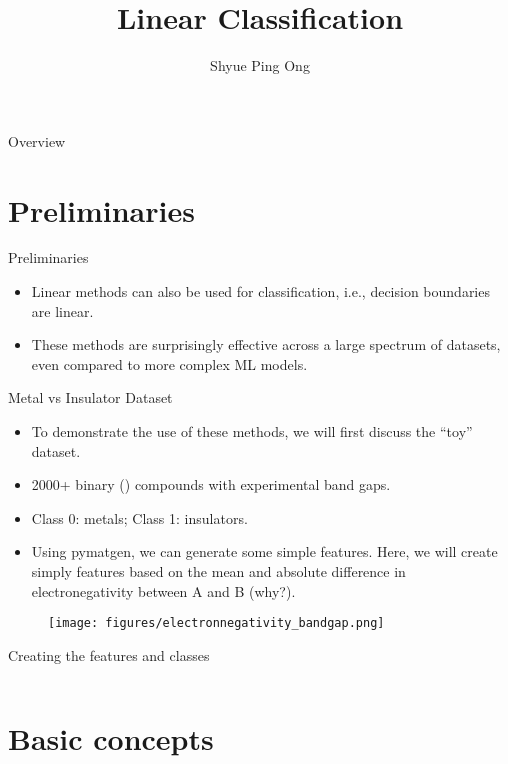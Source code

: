 \documentclass[aspectratio=169]{beamer}
\title[Linear Classification]{Linear Classification}
\author{Shyue Ping Ong}
\institute[UCSD]{University of California, San Diego\\
\medskip
}
\date{\classyear} %
\begin{document}
\begin{frame}
    \titlepage %
\end{frame}


\begin{frame}{Overview}
    \tableofcontents
\end{frame}


\section{Preliminaries}

\begin{frame}{Preliminaries}
    \begin{itemize}
        \item Linear methods can also be used for classification, i.e., decision boundaries are linear.
        \item These methods are surprisingly effective across a large spectrum of datasets, even compared to more complex ML models.
    \end{itemize}
\end{frame}


\begin{frame}{Metal vs Insulator Dataset}
    \begin{itemize}
        \item To demonstrate the use of these methods, we will first discuss the ``toy'' dataset.
        \item 2000+ binary () compounds with experimental band gaps.
        \item Class 0: metals; Class 1: insulators.
        \item Using pymatgen, we can generate some simple features. Here, we will create simply features based on the mean and absolute difference in electronegativity between A and B (why?).
    \end{itemize}
    \begin{figure}
        \centering
        \texttt{[image: figures/electronnegativity\_bandgap.png]}
    \end{figure}
\end{frame}


\begin{frame}[fragile]{Creating the features and classes}
\inputminted{python}{example_element_features.py}
\end{frame} 


\section{Basic concepts}
\end{document}
